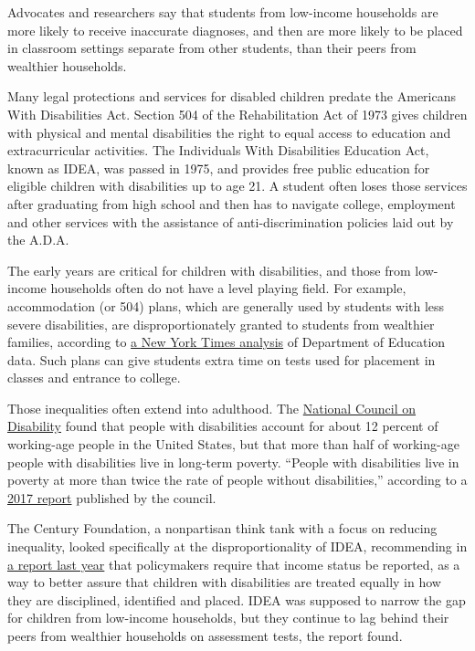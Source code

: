 Advocates and researchers say that students from low-income households
are more likely to receive inaccurate diagnoses, and then are more
likely to be placed in classroom settings separate from other students,
than their peers from wealthier households.

Many legal protections and services for disabled children predate the
Americans With Disabilities Act. Section 504 of the Rehabilitation Act
of 1973 gives children with physical and mental disabilities the right
to equal access to education and extracurricular activities. The
Individuals With Disabilities Education Act, known as IDEA, was passed
in 1975, and provides free public education for eligible children with
disabilities up to age 21. A student often loses those services after
graduating from high school and then has to navigate college, employment
and other services with the assistance of anti-discrimination policies
laid out by the A.D.A.

The early years are critical for children with disabilities, and those
from low-income households often do not have a level playing field. For
example, accommodation (or 504) plans, which are generally used by
students with less severe disabilities, are disproportionately granted
to students from wealthier families, according to
\href{https://www.nytimes3xbfgragh.onion/2019/07/30/us/extra-time-504-sat-act.html}{a
New York Times analysis} of Department of Education data. Such plans can
give students extra time on tests used for placement in classes and
entrance to college.

Those inequalities often extend into adulthood. The
\href{https://ncd.gov/events/2020/30onada30}{National Council on
Disability} found that people with disabilities account for about 12
percent of working-age people in the United States, but that more than
half of working-age people with disabilities live in long-term poverty.
``People with disabilities live in poverty at more than twice the rate
of people without disabilities,'' according to a
\href{https://ncd.gov/progressreport/2017/national-disability-policy-progress-report-october-2017}{2017
report} published by the council.

The Century Foundation, a nonpartisan think tank with a focus on
reducing inequality, looked specifically at the disproportionality of
IDEA, recommending in
\href{https://tcf.org/content/report/students-low-income-families-special-education/}{a
report last year} that policymakers require that income status be
reported, as a way to better assure that children with disabilities are
treated equally in how they are disciplined, identified and placed. IDEA
was supposed to narrow the gap for children from low-income households,
but they continue to lag behind their peers from wealthier households on
assessment tests, the report found.

